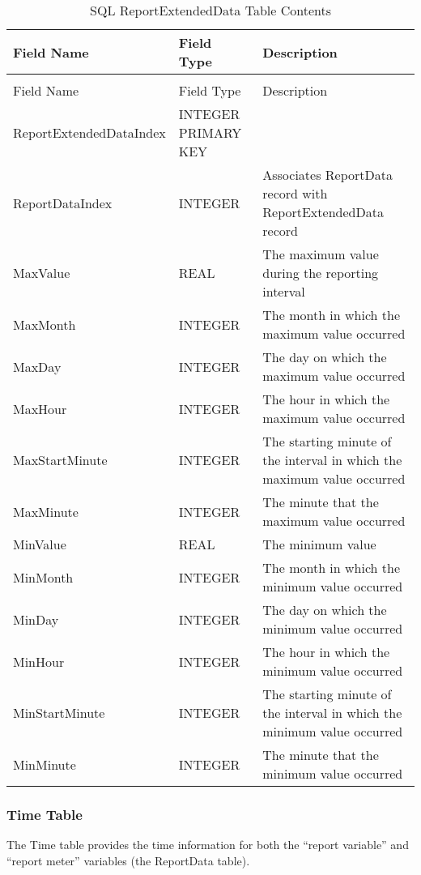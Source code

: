 \begin{longtable}[c]{p{1.5in}p{1.5in}p{3.0in}}
\caption{SQL ReportExtendedData Table Contents \label{table:table-9.-sql-reportextendeddata-table}} \tabularnewline
\toprule 
Field Name & Field Type & Description \tabularnewline
\midrule
\endfirsthead

\caption[]{SQL ReportExtendedData Table Contents} \tabularnewline
\toprule 
Field Name & Field Type & Description \tabularnewline
\midrule
\endhead

ReportExtendedDataIndex & INTEGER PRIMARY KEY &  \tabularnewline
ReportDataIndex & INTEGER & Associates ReportData record with ReportExtendedData record \tabularnewline
MaxValue & REAL & The maximum value during the reporting interval \tabularnewline
MaxMonth & INTEGER & The month in which the maximum value occurred \tabularnewline
MaxDay & INTEGER & The day on which the maximum value occurred \tabularnewline
MaxHour & INTEGER & The hour in which the maximum value occurred \tabularnewline
MaxStartMinute & INTEGER & The starting minute of the interval in which the maximum value occurred \tabularnewline
MaxMinute & INTEGER & The minute that the maximum value occurred \tabularnewline
MinValue & REAL & The minimum value \tabularnewline
MinMonth & INTEGER & The month in which the minimum value occurred \tabularnewline
MinDay & INTEGER & The day on which the minimum value occurred \tabularnewline
MinHour & INTEGER & The hour in which the minimum value occurred \tabularnewline
MinStartMinute & INTEGER & The starting minute of the interval in which the minimum value occurred \tabularnewline
MinMinute & INTEGER & The minute that the minimum value occurred \tabularnewline
\bottomrule
\end{longtable}

\subsubsection{Time Table}

The Time table provides the time information for both the “report variable” and “report meter” variables (the ReportData table).

